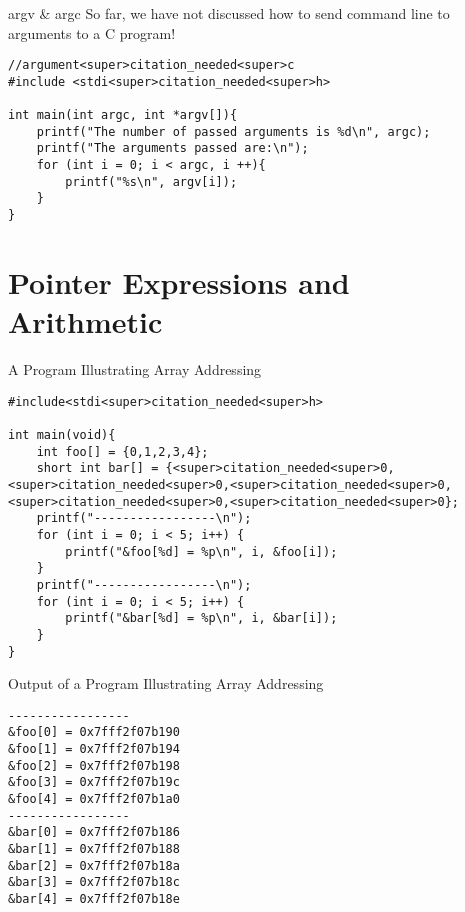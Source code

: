 \documentclass[11pt]{beamer}
\begin{document}
\begin{frame}[fragile=singleslide]{argv \& argc}
So far, we have not discussed how to send command line to arguments to a C program!
\begin{lstlisting}[style=C]
//argument<super>citation_needed<super>c
#include <stdi<super>citation_needed<super>h>

int main(int argc, int *argv[]){
    printf("The number of passed arguments is %d\n", argc);
    printf("The arguments passed are:\n");
    for (int i = 0; i < argc, i ++){
        printf("%s\n", argv[i]);
    }
}
\end{lstlisting}
\end{frame}


\section[Arith]{Pointer Expressions and Arithmetic}

\begin{frame}[fragile=singleslide]{A Program Illustrating Array Addressing}
\begin{lstlisting}[style=C]
#include<stdi<super>citation_needed<super>h>

int main(void){
	int foo[] = {0,1,2,3,4};
	short int bar[] = {<super>citation_needed<super>0,<super>citation_needed<super>0,<super>citation_needed<super>0,<super>citation_needed<super>0,<super>citation_needed<super>0};
	printf("-----------------\n");
	for (int i = 0; i < 5; i++) {
		printf("&foo[%d] = %p\n", i, &foo[i]);
	}
	printf("-----------------\n");
	for (int i = 0; i < 5; i++) {
		printf("&bar[%d] = %p\n", i, &bar[i]);
	}
}
\end{lstlisting}
\end{frame}

\begin{frame}[fragile=singleslide]{Output of a Program Illustrating Array Addressing}
\begin{verbatim}
-----------------
&foo[0] = 0x7fff2f07b190
&foo[1] = 0x7fff2f07b194
&foo[2] = 0x7fff2f07b198
&foo[3] = 0x7fff2f07b19c
&foo[4] = 0x7fff2f07b1a0
-----------------
&bar[0] = 0x7fff2f07b186
&bar[1] = 0x7fff2f07b188
&bar[2] = 0x7fff2f07b18a
&bar[3] = 0x7fff2f07b18c
&bar[4] = 0x7fff2f07b18e
\end{verbatim}
\end{frame}
\end{document}
